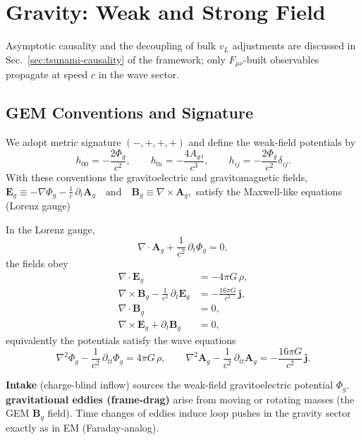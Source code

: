 \section{Gravity: Weak and Strong Field}
Asymptotic causality and the decoupling of bulk $v_L$ adjustments are discussed in Sec.~\ref{sec:tsunami-causality} of the framework; only $F_{\mu\nu}$-built observables propagate at speed $c$ in the wave sector.


\subsection*{GEM Conventions and Signature}
We adopt metric signature $(-,+,+,+)$ and define the weak-field potentials by
\begin{equation}
h_{00} = -\frac{2\Phi_g}{c^2},\qquad
h_{0i} = -\frac{4 A_{g\,i}}{c^3},\qquad
h_{ij} = -\frac{2\Phi_g}{c^2}\delta_{ij}.
\end{equation}
With these conventions the gravitoelectric and gravitomagnetic fields,
$\mathbf{E}_g \equiv -\nabla \Phi_g - \frac{1}{c}\,\partial_t \mathbf{A}_g \quad\text{and}\quad
\mathbf{B}_g \equiv \nabla \times \mathbf{A}_g,$
satisfy the Maxwell-like equations (Lorenz gauge)

In the Lorenz gauge,
\[
\nabla\!\cdot\!\mathbf{A}_g + \frac{1}{c^2}\,\partial_t \Phi_g = 0,
\]
the fields obey
\[
\begin{aligned}
\nabla\!\cdot\!\mathbf{E}_g &= -4\pi G\,\rho,\\
\nabla\!\times\!\mathbf{B}_g - \frac{1}{c^2}\,\partial_t \mathbf{E}_g &= -\frac{16\pi G}{c^2}\,\mathbf{j},\\
\nabla\!\cdot\!\mathbf{B}_g &= 0,\\
\nabla\!\times\!\mathbf{E}_g + \partial_t \mathbf{B}_g &= 0,
\end{aligned}
\]
equivalently the potentials satisfy the wave equations
\[
\nabla^2 \Phi_g - \frac{1}{c^2}\,\partial_{tt} \Phi_g = 4\pi G\,\rho,\qquad
\nabla^2 \mathbf{A}_g - \frac{1}{c^2}\,\partial_{tt} \mathbf{A}_g = -\frac{16\pi G}{c^2}\,\mathbf{j}.
\]

\begin{tcolorbox}[title=Terminology bridge (gravity side)]
\textbf{Intake} (charge-blind inflow) sources the weak-field gravitoelectric potential $\Phi_g$.
\textbf{gravitational eddies (frame-drag)} arise from moving or rotating masses (the GEM $\mathbf B_g$ field).
Time changes of eddies induce loop pushes in the gravity sector exactly as in EM (Faraday-analog).
\end{tcolorbox}


